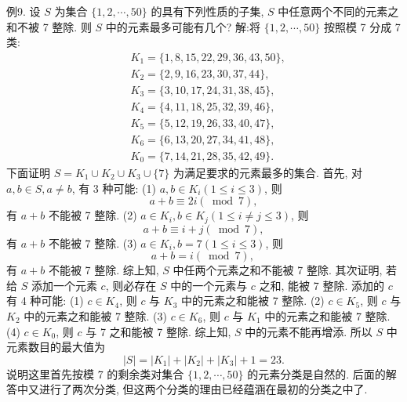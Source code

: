 例9. 设 $S$ 为集合 $\{1,2, \cdots, 50\}$ 的具有下列性质的子集, $S$ 中任意两个不同的元素之和不被 7 整除.
则 $S$ 中的元素最多可能有几个?
解:将 $\{1,2, \cdots, 50\}$ 按照模 7 分成 7 类:
$$
\begin{aligned}
& K_1=\{1,8,15,22,29,36,43,50\}, \\
& K_2=\{2,9,16,23,30,37,44\}, \\
& K_3=\{3,10,17,24,31,38,45\}, \\
& K_4=\{4,11,18,25,32,39,46\}, \\
& K_5=\{5,12,19,26,33,40,47\}, \\
& K_6=\{6,13,20,27,34,41,48\}, \\
& K_0=\{7,14,21,28,35,42,49\} .
\end{aligned}
$$
下面证明 $S=K_1 \cup K_2 \cup K_3 \cup\{7\}$ 为满足要求的元素最多的集合.
首先, 对 $a, b \in S, a \neq b$, 有 3 种可能:
(1) $a, b \in K_i(1 \leqslant i \leqslant 3)$, 则
$$
a+b \equiv 2 i(\bmod 7),
$$
有 $a+b$ 不能被 7 整除.
(2) $a \in K_i, b \in K_j(1 \leqslant i \neq j \leqslant 3)$, 则
$$
a+b \equiv i+j(\bmod 7),
$$
有 $a+b$ 不能被 7 整除.
(3) $a \in K_i, b=7(1 \leqslant i \leqslant 3)$, 则
$$
a+b=i(\bmod 7) \text {, }
$$
有 $a+b$ 不能被 7 整除.
综上知, $S$ 中任两个元素之和不能被 7 整除.
其次证明, 若给 $S$ 添加一个元素 $c$, 则必存在 $S$ 中的一个元素与 $c$ 之和, 能被 7 整除.
添加的 $c$ 有 4 种可能:
(1) $c \in K_4$, 则 $c$ 与 $K_3$ 中的元素之和能被 7 整除.
(2) $c \in K_5$, 则 $c$ 与 $K_2$ 中的元素之和能被 7 整除.
(3) $c \in K_6$, 则 $c$ 与 $K_1$ 中的元素之和能被 7 整除.
(4) $c \in K_0$, 则 $c$ 与 7 之和能被 7 整除.
综上知, $S$ 中的元素不能再增添.
所以 $S$ 中元素数目的最大值为
$$
|S|=\left|K_1\right|+\left|K_2\right|+\left|K_3\right|+1=23 .
$$
说明这里首先按模 7 的剩余类对集合 $\{1,2, \cdots, 50\}$ 的元素分类是自然的.
后面的解答中又进行了两次分类, 但这两个分类的理由已经蕴涵在最初的分类之中了.



